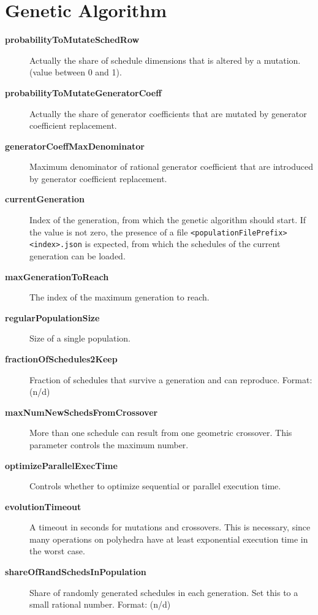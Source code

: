 \documentclass{article}
\begin{document}
    \section{Genetic Algorithm}
    \begin{description}
      \item[\textbf{probabilityToMutateSchedRow}] Actually the share of schedule
      dimensions that is altered by a mutation. (value between 0 and 1).
      \item[\textbf{probabilityToMutateGeneratorCoeff}] Actually the share of
      generator coefficients that are mutated by generator coefficient replacement.

      \item[\textbf{generatorCoeffMaxDenominator}] Maximum denominator of rational
      generator coefficient that are introduced by generator coefficient replacement.
      \item[\textbf{currentGeneration}] Index of the generation, from which the
      genetic algorithm should start. If the value is not zero, the presence of
      a file \texttt{<populationFilePrefix><index>.json} is expected, from which
      the schedules of the current generation can be loaded.

      \item[\textbf{maxGenerationToReach}] The index of the maximum generation to reach.
      \item[\textbf{regularPopulationSize}] Size of a single population.
      \item[\textbf{fractionOfSchedules2Keep}] Fraction of schedules that survive
      a generation and can reproduce. Format: (n/d)
      \item[\textbf{maxNumNewSchedsFromCrossover}] More than one schedule can
      result from one geometric crossover. This parameter controls the maximum number.
      \item[\textbf{optimizeParallelExecTime}] Controls whether to optimize
      sequential or parallel execution time.
      \item[\textbf{evolutionTimeout}] A timeout in seconds for mutations and
      crossovers. This is necessary, since many operations on polyhedra have at
      least exponential execution time in the worst case.
      \item[\textbf{shareOfRandSchedsInPopulation}] Share of randomly generated
      schedules in each generation. Set this to a small rational number. Format: (n/d)


\end{description}
\end{document}
